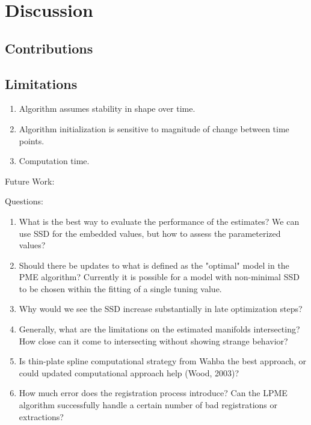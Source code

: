 \documentclass[11pt,reqno]{article}
\theoremstyle{definition}
\begin{document}
\section{Discussion}

\subsection*{Contributions}

\subsection*{Limitations}

\begin{enumerate}
  \item Algorithm assumes stability in shape over time.
  \item Algorithm initialization is sensitive to magnitude of change between time points.
  \item Computation time.
\end{enumerate}

Future Work:

Questions:
\begin{enumerate}
  \item What is the best way to evaluate the performance of the estimates? We can use SSD for the embedded values, but how to assess the parameterized values?
  \item Should there be updates to what is defined as the "optimal" model in the PME algorithm? Currently it is possible for a model with non-minimal SSD to be chosen within the fitting of a single tuning value.
  \item Why would we see the SSD increase substantially in late optimization steps?
  \item Generally, what are the limitations on the estimated manifolds intersecting? How close can it come to intersecting without showing strange behavior?
  \item Is thin-plate spline computational strategy from Wahba the best approach, or could updated computational approach help (Wood, 2003)?
  \item How much error does the registration process introduce? Can the LPME algorithm successfully handle a certain number of bad registrations or extractions?
\end{enumerate}

\nocite{*}
%
%
\printbibliography
\end{document}
